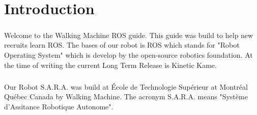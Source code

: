 \chapter{Introduction}
\paragraph{}
Welcome to the Walking Machine ROS guide. This guide was build to help new recruits learn ROS. The bases of our robot is ROS which stands for "Robot Operating System" which is develop by the open-source robotics foundation. At the time of writing the current Long Term Release is Kinetic Kame. 
\paragraph{}
Our Robot S.A.R.A. was build at École de Technologie Supérieur at Montréal Québec Canada by Walking Machine. The acronym S.A.R.A. means "Système d'Assitance Robotique Autonome".
